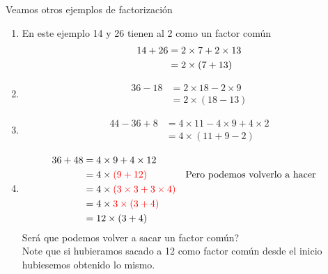 \begin{ejemplo}
		Veamos otros ejemplos de factorización

		\begin{enumerate}[label=\Alph*)]
			\item 	En este ejemplo 14 y 26 tienen al 2 como un factor común
						\begin{align*}
						\vspace{-0.5cm}
						14+ 26 &= 2\times 7 + 2\times 13 \\
						&= 2\times (7+13)
						\end{align*}
						
			\item 	
						\begin{align*}
						36- 18 &= 2\times 18-2\times 9 \\
						&= 2\times (18-13)
						\end{align*}
						
			\item 	
						\begin{align*}
						44- 36 + 8 &= 4\times 11-4\times 9 + 4\times 2 \\
						&= 4\times (11+9-2)
						\end{align*}
						
			\item 
						\begin{align*}
						36+48 &= 4\times 9 + 4\times 12 \\
									&= 4\times \color{red}(9+12) \color{black}&&\text{Pero podemos volverlo a hacer}\\
									&= 4\times \color{red}(3\times 3+3\times 4) \color{black} \\
									&=4\times \color{red}3 \times (3+4) \color{black}\\
									&=12 \times (3+4)
						\end{align*}
						Será que podemos volver a sacar un factor común?\\
						Note que si hubieramos sacado a 12 como factor común desde el inicio hubiesemos obtenido lo mismo.
		\end{enumerate}
\end{ejemplo}



